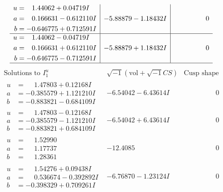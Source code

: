 \documentclass[1p]{elsarticle_modified}
\theoremstyle{definition}
\newcommand{\I}{\sqrt{-1}}
\begin{document}
$$\begin{array}{c|c|c}
\begin{aligned}
u &= \phantom{-}1.44062 + 0.04719 I \\
a &= \phantom{-}0.166631 - 0.612110 I \\
b &= -0.646775 + 0.712591 I\end{aligned}
 & -5.88879 - 1.18432 I & \phantom{-0.000000 } 0 \\ \hline\begin{aligned}
u &= \phantom{-}1.44062 - 0.04719 I \\
a &= \phantom{-}0.166631 + 0.612110 I \\
b &= -0.646775 - 0.712591 I\end{aligned}
 & -5.88879 + 1.18432 I & \phantom{-0.000000 } 0\\
 \hline 
 \end{array}$$\newpage$$\begin{array}{c|c|c}  
\text{Solutions to }I^u_{1}& \I (\text{vol} + \sqrt{-1}CS) & \text{Cusp shape}\\
 \hline 
\begin{aligned}
u &= \phantom{-}1.47803 + 0.12168 I \\
a &= -0.385579 + 1.121210 I \\
b &= -0.883821 - 0.684109 I\end{aligned}
 & -6.54042 - 6.43614 I & \phantom{-0.000000 } 0 \\ \hline\begin{aligned}
u &= \phantom{-}1.47803 - 0.12168 I \\
a &= -0.385579 - 1.121210 I \\
b &= -0.883821 + 0.684109 I\end{aligned}
 & -6.54042 + 6.43614 I & \phantom{-0.000000 } 0 \\ \hline\begin{aligned}
u &= \phantom{-}1.52990\phantom{ +0.000000I} \\
a &= \phantom{-}1.17737\phantom{ +0.000000I} \\
b &= \phantom{-}1.28361\phantom{ +0.000000I}\end{aligned}
 & -12.4085\phantom{ +0.000000I} & \phantom{-0.000000 } 0 \\ \hline\begin{aligned}
u &= \phantom{-}1.54276 + 0.09438 I \\
a &= \phantom{-}0.536674 - 0.392892 I \\
b &= -0.398329 + 0.709261 I\end{aligned}
 & -6.76870 - 1.23124 I & \phantom{-0.000000 } 0 \\ \hline\begin{aligned}

\end{aligned}
\end{array}$$
\end{document}
